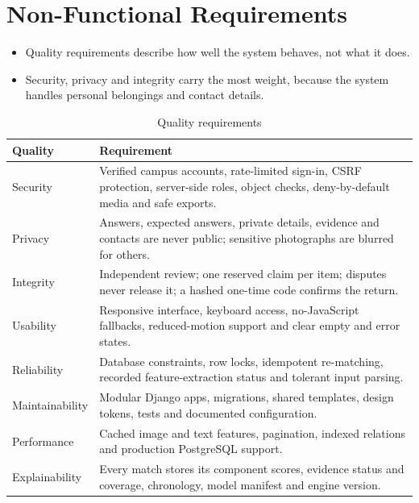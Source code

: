 \documentclass[12pt,a4paper,oneside]{report}
\begin{document}
\section{Non-Functional Requirements}
\begin{itemize}
  \item Quality requirements describe how well the system behaves, not what it does.
  \item Security, privacy and integrity carry the most weight, because the system handles personal belongings and contact details.
\end{itemize}
\begin{table}[H]
\centering\small
\caption{Quality requirements}
\begin{tabularx}{\textwidth}{P{27mm}X}
\toprule
Quality & Requirement\\
\midrule
Security & Verified campus accounts, rate-limited sign-in, CSRF protection, server-side roles, object checks, deny-by-default media and safe exports.\\
Privacy & Answers, expected answers, private details, evidence and contacts are never public; sensitive photographs are blurred for others.\\
Integrity & Independent review; one reserved claim per item; disputes never release it; a hashed one-time code confirms the return.\\
Usability & Responsive interface, keyboard access, no-JavaScript fallbacks, reduced-motion support and clear empty and error states.\\
Reliability & Database constraints, row locks, idempotent re-matching, recorded feature-extraction status and tolerant input parsing.\\
Maintainability & Modular Django apps, migrations, shared templates, design tokens, tests and documented configuration.\\
Performance & Cached image and text features, pagination, indexed relations and production PostgreSQL support.\\
Explainability & Every match stores its component scores, evidence status and coverage, chronology, model manifest and engine version.\\
\bottomrule
\end{tabularx}
\end{table}
\end{document}
